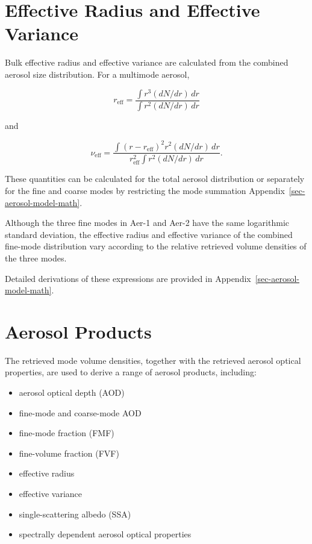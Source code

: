 \documentclass[
  11pt,
  letterpaper,
]{scrreprt}
\providecommand{\tightlist}{%
  \setlength{\itemsep}{0pt}\setlength{\parskip}{0pt}}
\begin{document}
\section{Effective Radius and Effective
Variance}\label{effective-radius-and-effective-variance}

Bulk effective radius and effective variance are calculated from the
combined aerosol size distribution. For a multimode aerosol,

\[
r_{\mathrm{eff}}
=
\frac{
\int r^3(dN/dr)\,dr
}{
\int r^2(dN/dr)\,dr
}
\]

and

\[
\nu_{\mathrm{eff}}
=
\frac{
\int
(r-r_{\mathrm{eff}})^2
r^2(dN/dr)\,dr
}{
r_{\mathrm{eff}}^2
\int r^2(dN/dr)\,dr
}.
\]

These quantities can be calculated for the total aerosol distribution or
separately for the fine and coarse modes by restricting the mode
summation Appendix~\ref{sec-aerosol-model-math}.

Although the three fine modes in Aer-1 and Aer-2 have the same
logarithmic standard deviation, the effective radius and effective
variance of the combined fine-mode distribution vary according to the
relative retrieved volume densities of the three modes.

Detailed derivations of these expressions are provided in
Appendix~\ref{sec-aerosol-model-math}.

\section{Aerosol Products}\label{aerosol-products}

The retrieved mode volume densities, together with the retrieved aerosol
optical properties, are used to derive a range of aerosol products,
including:

\begin{itemize}
\tightlist
\item
  aerosol optical depth (AOD)
\item
  fine-mode and coarse-mode AOD
\item
  fine-mode fraction (FMF)
\item
  fine-volume fraction (FVF)
\item
  effective radius
\item
  effective variance
\item
  single-scattering albedo (SSA)
\item
  spectrally dependent aerosol optical properties
\end{itemize}
\end{document}
